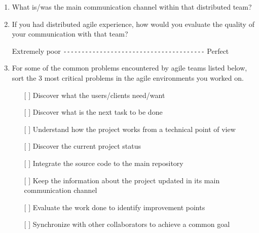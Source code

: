 \documentclass[lnbip]{svmultln}
\begin{document}
\begin{small}
\begin{enumerate}
  \item What is/was the main communication channel within that
    distributed team?
    \vspace{8pt}

  \item If you had distributed agile experience, how would you
    evaluate the quality of your communication with that team?

    Extremely poor \verb=---------------------------------------=
    Perfect \vspace{8pt}

  \item For some of the common problems encountered by agile teams
    listed below, sort the 3 most critical problems in the agile
    environments you worked on.
    \begin{itemize}
    \item[[ ] ] Discover what the users/clients need/want
    \item[[ ] ] Discover what is the next task to be done
    \item[[ ] ] Understand how the project works from a technical
      point of view
    \item[[ ] ] Discover the current project status
    \item[[ ] ] Integrate the source code to the main repository
    \item[[ ] ] Keep the information about the project updated in its
      main communication channel
    \item[[ ] ] Evaluate the work done to identify improvement points
    \item[[ ] ] Synchronize with other collaborators to achieve a
      common goal
    \end{itemize}
    \vspace{8pt}


\end{enumerate}
\end{small}
\end{document}
